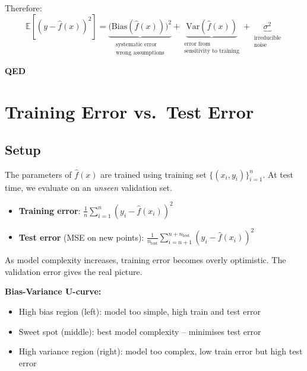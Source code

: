 \documentclass[12pt,a4paper]{article}
\newcommand{\E}{\mathbb{E}}
\newcommand{\Var}{\mathrm{Var}}
\newcommand{\Bias}{\mathrm{Bias}}
\begin{document}
Therefore:
\[
  \boxed{
    \E\!\left[(y - \hat{f}(x))^2\right]
    = \underbrace{\bigl(\Bias(\hat{f}(x))\bigr)^2}_{\substack{\text{systematic error}\\\text{wrong assumptions}}}
    + \underbrace{\Var(\hat{f}(x))}_{\substack{\text{error from}\\\text{sensitivity to training}}}
    + \underbrace{\sigma^2}_{\substack{\text{irreducible}\\\text{noise}}}
  }
\]

\hfill\textbf{QED}

\section{Training Error vs.\ Test Error}

\subsection{Setup}

The parameters of $\hat{f}(x)$ are trained using training set $\{(x_i, y_i)\}_{i=1}^{n}$. At test time, we evaluate on an \emph{unseen} validation set.

\begin{definitionbox}
\begin{itemize}
  \item \textbf{Training error}: $\frac{1}{n}\sum_{i=1}^{n}(y_i - \hat{f}(x_i))^2$
  \item \textbf{Test error} (MSE on new points): $\frac{1}{n_{\text{test}}}\sum_{i=n+1}^{n+n_{\text{test}}}(y_i - \hat{f}(x_i))^2$
\end{itemize}
\end{definitionbox}

As model complexity increases, training error becomes overly optimistic. The validation error gives the real picture.

\textbf{Bias-Variance U-curve:}
\begin{itemize}
  \item High bias region (left): model too simple, high train and test error
  \item Sweet spot (middle): best model complexity -- minimises test error
  \item High variance region (right): model too complex, low train error but high test error
\end{itemize}
\end{document}
